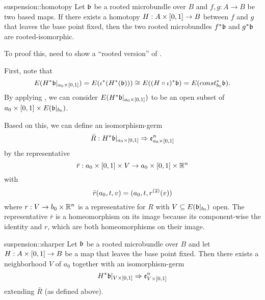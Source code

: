 \begin{mytheorem}{suspension::homotopy}
    Let $\mathfrak{b}$ be a rooted microbundle over $B$ and $f, g: A \to B$ be two based maps.
    If there exists a homotopy $H: A \times{} [0, 1] \to B$ between $f$ and $g$ that leaves the base point fixed,
    then the two rooted microbundles $f^*\mathfrak{b}$ and $g^*\mathfrak{b}$ are rooted-isomorphic.
\end{mytheorem}

\begin{myparagraph}
    To proof this, need to show a ``rooted version'' of .
    
    First, note that 
    \[
        E(H^*\mathfrak{b}\vert_{a_0 \times{} [0, 1]}) = E(\iota^*(H^*(\mathfrak{b})))
        \cong E((H \circ \iota)^*\mathfrak{b}) = E(const_{b_0}^*\mathfrak{b}).
    \]
    By applying , we can consider $E(H^*\mathfrak{b}\vert_{a_0 \times{} [0, 1]})$
    to be an open subset of $a_0 \times [0, 1] \times E(\mathfrak{b}\vert_{b_0})$.

    Based on this, we can define an isomorphism-germ
    \[ \bar{R}: H^*\mathfrak{b}\vert_{a_0 \times{} [0, 1]} \Rightarrow{} \mathfrak{e}^{n}_{a_0 \times{} [0, 1]} \]
    by the representative
    \[ \bar{r}: a_0 \times{} [0, 1] \times V \to a_0 \times{} [0, 1] \times \mathbb{R}^n \]
    with
    \[ \bar{r}(a_0, t, v) = (a_0, t, r^{(2)}(v) )\]
    where $r: V \to b_0 \times \mathbb{R}^n$ is a representative for $R$ with $V \subseteq{} E(\mathfrak{b}\vert_{b_0})$ open.
    The representative $\bar{r}$ is a homeomorphism on its image
    because its component-wise the identity and $r$, which are both homeomorphisms on their image. 
\end{myparagraph}

\begin{mylemma}{suspension::sharper}
    Let $\mathfrak{b}$ be a rooted microbundle over $B$ and
    let $H: A \times{} [0, 1] \to B$ be a map that leaves the base point fixed.
    Then there exists a neighborhood $V$ of $a_0$ together with an isomorphism-germ
    \[ H^*\mathfrak{b}\vert_{V \times{} [0, 1]} \Rightarrow{} \mathfrak{e}^{n}_{V \times{} [0, 1]} \]
    extending $\bar{R}$ (as defined above).
\end{mylemma}


